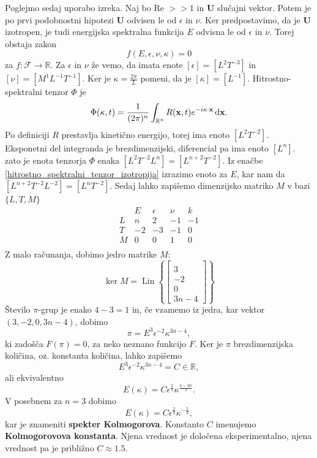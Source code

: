 \documentclass[mat2, tisk]{fmfdelo}
\newcommand{\R}{\mathbb R}
\newcommand{\bd}{\textbf}
\begin{document}
Poglejmo sedaj uporabo izreka. Naj bo Re $>\!\!> 1$ in $\bd{U}$ 
slučajni vektor. Potem je po prvi podobnostni hipotezi $\bd{U}$
odvisen le od $\epsilon$ in $\nu$. Ker predpostavimo, da je $\bd{U}$
izotropen, je tudi energijska spektralna funkcija $E$ odvisna le 
od $\epsilon$ in $\nu$. Torej obstaja zakon 
$$
f(E, \epsilon, \nu, \kappa) = 0
$$
za $f:\mathcal{F} \rightarrow \R$. Za $\epsilon$ in $\nu$ že vemo, da imata
enote $[\epsilon] = [L^2 T^{-3}]$ in $[\nu] = [M^1 L^{-1}T^{-1}]$. Ker je 
$\kappa = \frac{2\pi}{L}$ pomeni, da je $[\kappa] = [L^{-1}]$.
Hitrostno-spektralni tenzor $\Phi$ je 
$$
\Phi(\text{\bd{$\kappa$}}, t) = \frac{1}{(2\pi)^n} \int_{\R^n} {R}(\bd{x}, t) e^{-i\text{\bd{$\kappa$}} \cdot \bd{x}} \dif \bd{x}.
$$
Po definiciji $R$ prestavlja kinetično energijo, torej ima enoto $[L^2T^{-2}]$.
Eksponetni del integranda je brezdimenzijski, diferencial pa ima enoto $[L^{n}]$. zato je enota
tenzorja $\Phi$ enaka $[L^2T^{-2}L^n] = [L^{n+2}T^{-2}]$. Iz 
enačbe \ref{hitrostno_spektralni_tenzor_izotropija} izrazimo enoto za 
$E$, kar nam da $[L^{n+2} T^{-2} L^{-2}] = [L^n T^{-2}]$. Sedaj lahko 
zapišemo dimenzijsko matriko $M$ v bazi $\{L, T, M\}$
\[
\begin{array}{c|rrrr}
 & E & \epsilon & \nu & k \\[-3mm]
\hline
L & n & 2 & -1 & -1 \\[-3mm]
T & -2 & -3 & -1 & 0\\[-3mm]
M & 0 & 0 & 1 & 0 \\
\end{array}
\]
Z malo računanja, dobimo jedro matrike $M$:
$$
\operatorname{ker} M = \operatorname{Lin} \left\{ 
\begin{bmatrix} 
\\[-17mm]
3 \\[-5mm]
-2 \\[-5mm]
0 \\[-5mm]
3n - 4 
\end{bmatrix} 
\right\}$$
Število $\pi$-grup je enako $4 - 3 = 1$ in, če vzamemo iz jedra, kar vektor $(3, -2, 0, 3n-4)$,
dobimo
$$
\pi = E^{3} \epsilon^{-2} \kappa^{3n - 4}, 
$$
ki zadošča $F(\pi) = 0$, za neko neznano funkcijo $F$. Ker je $\pi$ brezdimenzijska količina,
oz. konstanta količina, lahko zapišemo
\begin{equation}
  E^{3} \epsilon^{-2} \kappa^{3n - 4} = C \in \R,
\end{equation}
ali ekvivalentno 
\begin{equation}
  E(\kappa) = C \epsilon^{\frac{2}{3}} \kappa^{\frac{4 - 3n}{3}}.
\end{equation}
V posebnem za $n=3$ dobimo 
\begin{equation}
E(\kappa) = C \epsilon^{\frac{2}{3}} \kappa^{-\frac{5}{3}},
\end{equation}
kar je znameniti \textbf{spekter Kolmogorova}. Konstanto $C$ imenujemo 
\textbf{Kolmogorovova konstanta}. Njena vrednost je določena eksperimentalno, 
njena vrednost pa je približno $C \approx 1.5$.
\end{document}
